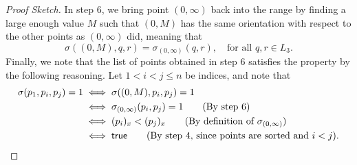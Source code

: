 \begin{proof}[Proof Sketch]
In step 6, we bring point $(0, \infty)$ back into the range by finding a large enough value $M$ such that $(0, M)$ has the same orientation with respect to the other points as $(0, \infty)$ did, meaning that 
\[
\sigma((0, M), q, r) = \sigma_{(0, \infty)}(q, r), \quad \text{for all } q, r \in L_3.
\] Finally, we note that the list of points obtained in step 6 satisfies the  property by the following reasoning. Let $1 < i < j \leq n$ be indices, and note that 
\begin{align*}
  \sigma(p_1, p_i, p_j) = 1 &\iff \sigma((0, M), p_i, p_j) = 1\\
                            &\iff \sigma_{(0, \infty)}(p_i, p_j) = 1\tag{By step 6}\\
                            &\iff (p_i)_x < (p_j)_x \tag{By definition of $\sigma_{(0, \infty)}$}\\
                            &\iff \textsf{true} \tag{By step 4, since points are sorted and $i < j$}.
\end{align*}
\end{proof}

